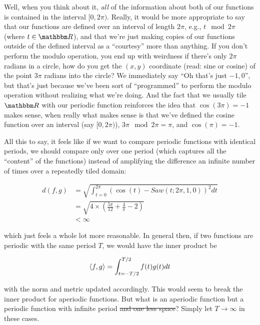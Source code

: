 \documentclass[../main/main.tex]{subfiles}
\begin{document}
Well, when you think about it, \emph{all} of the information
about both of our functions 
is contained in the interval \([0, 2\pi)\).
Really, it would be more appropriate to say that our
functions are defined over an interval of length \(2\pi\),
e.g.,
\(t \mod 2\pi \) (where \(t \in \domain{R}\)), and that
we're just making copies of our functions outside of
the defined interval as a ``courtesy'' more than
anything. If you don't perform the modulo operation,
you end up with weirdness \textemdash{} if there's only
\(2\pi\) radians in a circle, how do you get the
\((x,y)\) coordinate (read: sine or cosine) of the
point \(3\pi\) radians into the circle? We immediately
say ``Oh that's just \(-1,0\)'', but that's just because
we've been sort of ``programmed'' to perform the modulo
operation without realizing what we're doing.
And the
fact that we usually tile \(\domain{R}\) 
with our periodic function
reinforces the idea that \(\cos(3\pi) = -1\) makes sense, when
really what makes sense is that we've defined the cosine function
over an interval (say \([0, 2\pi)\)), \(3\pi \mod 2\pi = \pi\),
and \(\cos(\pi) = -1\).\par

All this to say, it feels like if we want to compare periodic
functions with identical periods, we should compare
only over one period (which captures all the ``content''
of the functions) instead of amplifying the difference an
infinite number of times over a repeatedly tiled domain:

\[
\begin{split} d(f,g) &= \sqrt{\int_{t = 0}^{2\pi} \left(\cos(t) - Saw(t; 2\pi, 1, 0)\right)^2 dt} \\
  &= \sqrt{4 \times \left(\frac{5\pi}{12} + \frac{4}{\pi} - 2\right)} \\
  &< \infty
\end{split}
\]

which just feels a whole lot more reasonable.
In general then, if two functions are periodic with the same period \(T\),
we would have the inner product be

\[\left<f,g\right> = \int_{t=-T/2}^{T/2} f(t)g(t) dt \]

with the norm and metric updated accordingly.
This would seem to break the inner product for aperiodic functions.
But what is an aperiodic function but a periodic function with
infinite period \sout{and one less space}?
Simply let \(T \rightarrow \infty\) in these cases.
\end{document}
